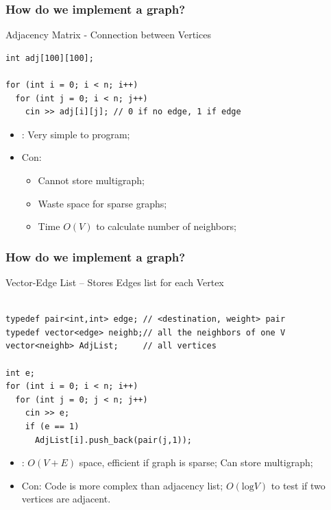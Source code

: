 \begin{frame}[fragile]
  \frametitle{How do we implement a graph?}
  \begin{block}{Adjacency Matrix - Connection between Vertices}
\begin{verbatim}
int adj[100][100];

for (int i = 0; i < n; i++)
  for (int j = 0; i < n; j++)
    cin >> adj[i][j]; // 0 if no edge, 1 if edge
\end{verbatim}

    \begin{itemize}
    \item {}: Very simple to program;
    \item \alert{Con}:
      \begin{itemize}
      \item Cannot store multigraph;
      \item Waste space for sparse graphs;
      \item Time $O(V)$ to calculate number of neighbors;
      \end{itemize}
    \end{itemize}
  \end{block}
\end{frame}

\begin{frame}[fragile]
  \frametitle{How do we implement a graph?}

  {\smaller
  \begin{block}{Vector-Edge List -- Stores Edges list for each Vertex}
\begin{verbatim}

typedef pair<int,int> edge; // <destination, weight> pair
typedef vector<edge> neighb;// all the neighbors of one V
vector<neighb> AdjList;     // all vertices

int e;
for (int i = 0; i < n; i++)
  for (int j = 0; j < n; j++)
    cin >> e;
    if (e == 1)
      AdjList[i].push_back(pair(j,1));

\end{verbatim}

    \begin{itemize}
    \item {}: $O(V+E)$ space, efficient if
      graph is sparse; Can store multigraph;
    \item \alert{Con}: Code is more complex
      than adjacency list; $O(\text{log}V)$
      to test if two vertices are adjacent.
    \end{itemize}
  \end{block}
  }
\end{frame}

